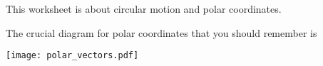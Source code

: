 This worksheet is about circular motion and polar coordinates.

The crucial diagram for polar coordinates that you should remember is
\begin{center}
  \texttt{[image: polar\_vectors.pdf]}
\end{center}
